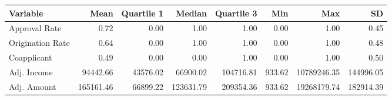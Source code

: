 \begin{tabular}{lrrrrrrr}
  \hline
Variable & Mean & Quartile 1 & Median & Quartile 3 & Min & Max & SD \\ 
  \hline
Approval Rate & 0.72 & 0.00 & 1.00 & 1.00 & 0.00 & 1.00 & 0.45 \\ 
  Origination Rate & 0.64 & 0.00 & 1.00 & 1.00 & 0.00 & 1.00 & 0.48 \\ 
  Coapplicant & 0.49 & 0.00 & 0.00 & 1.00 & 0.00 & 1.00 & 0.50 \\ 
  Adj. Income & 94442.66 & 43576.02 & 66900.02 & 104716.81 & 933.62 & 10789246.35 & 144996.05 \\ 
  Adj. Amount & 165161.46 & 66899.22 & 123631.79 & 209354.36 & 933.62 & 19268179.74 & 182914.39 \\ 
   \hline
\end{tabular}

